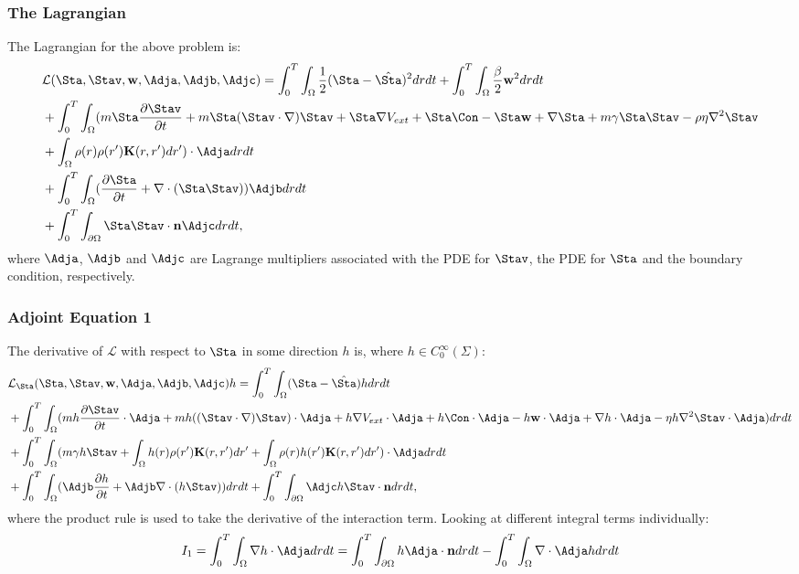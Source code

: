 \subsubsection*{The Lagrangian}
The Lagrangian for the above problem is:
\begin{align*}
&\mathcal{L}(\Sta,\Stav,\mathbf{w},\Adja,\Adjb,\Adjc) = \int_0^T \int_\Omega  \frac{1}{2}(\Sta - \hat \Sta)^2 drdt  +\int_0^T \int_\Omega  \frac{\beta}{2}\mathbf{w}^2 drdt\\
&+ \int_0^T \int_\Omega (m \Sta \frac{\partial \Stav}{\partial t} + m \Sta (\Stav \cdot \nabla)\Stav + \Sta \nabla V_{ext} + \Sta \Con - \Sta \mathbf{w} + \nabla \Sta + m\gamma \Sta \Stav  - \rho \eta \nabla^2 \Stav\\
&+\int_\Omega \rho(r) \rho(r') \mathbf{K}(r,r')dr') \cdot \Adja dr dt\\
& + \int_0^T \int_\Omega (\frac{\partial \Sta}{\partial t} + \nabla \cdot (\Sta \Stav)) \Adjb dr dt\\ 
& +\int_0^T \int_{\partial\Omega} \Sta \Stav \cdot \mathbf{n} \Adjc dr dt,
\end{align*}
where $\Adja$, $\Adjb$ and $\Adjc$ are Lagrange multipliers associated with the PDE for $\Stav$, the PDE for $\Sta$ and the boundary condition, respectively.


\subsubsection{Adjoint Equation 1}

The derivative of $\mathcal{L}$ with respect to $\Sta$ in some direction $h$ is, where ${h} \in C_0^\infty(\Sigma) $:
\begin{align*}
&\mathcal{L}_\Sta(\Sta,\Stav,\mathbf{w},\Adja,\Adjb,\Adjc)h = \int_0^T \int_\Omega  (\Sta - \hat \Sta)h drdt \\
&+ \int_0^T \int_\Omega (m h \frac{\partial \Stav}{\partial t}\cdot \Adja + m h( (\Stav \cdot \nabla)\Stav )\cdot \Adja+ h\nabla V_{ext}\cdot \Adja + h \Con \cdot  \Adja - h \mathbf{w} \cdot \Adja + \nabla h\cdot \Adja - \eta h \nabla^2 \Stav \cdot \Adja)  dr dt\\
&+ \int_0^T \int_\Omega (m\gamma h \Stav +\int_\Omega h(r) \rho(r') \mathbf{K}(r,r')dr'+\int_\Omega \rho(r) h(r') \mathbf{K}(r,r') dr') \cdot \Adja dr dt\\
& + \int_0^T \int_\Omega (\Adjb\frac{\partial h}{\partial t} + \Adjb\nabla \cdot (h \Stav))  dr dt +\int_0^T \int_{\partial\Omega} \Adjc h\Stav \cdot \mathbf{n}  dr dt,
\end{align*}
where the product rule is used to take the derivative of the interaction term.
Looking at different integral terms individually:
\begin{align*}
I_1= \int_0^T \int_\Omega \nabla h\cdot \Adja dr dt = \int_0^T \int_{\partial \Omega} h \Adja \cdot \mathbf{n} dr dt - \int_0^T \int_{\Omega} \nabla\cdot \Adja h dr dt
\end{align*}
 
